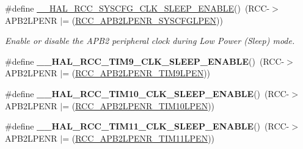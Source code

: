 \begin{DoxyCompactItemize}
\item 
\#define \hyperlink{group___r_c_c___peripheral___clock___sleep___enable___disable_ga6e3a8ca9e554e3aa7aba57d034725655}{\-\_\-\-\_\-\-H\-A\-L\-\_\-\-R\-C\-C\-\_\-\-S\-Y\-S\-C\-F\-G\-\_\-\-C\-L\-K\-\_\-\-S\-L\-E\-E\-P\-\_\-\-E\-N\-A\-B\-L\-E}()~(R\-C\-C-\/$>$A\-P\-B2\-L\-P\-E\-N\-R $\vert$= (\hyperlink{group___peripheral___registers___bits___definition_gaaa82cfc33f0cf71220398bbe1c4b412e}{R\-C\-C\-\_\-\-A\-P\-B2\-L\-P\-E\-N\-R\-\_\-\-S\-Y\-S\-C\-F\-G\-L\-P\-E\-N}))
\begin{DoxyCompactList}\small\item\em Enable or disable the A\-P\-B2 peripheral clock during Low Power (Sleep) mode. \end{DoxyCompactList}\item 
\hypertarget{group___r_c_c___peripheral___clock___sleep___enable___disable_ga8fb59f888889fc998d1f7e64e370c9d1}{\#define {\bfseries \-\_\-\-\_\-\-H\-A\-L\-\_\-\-R\-C\-C\-\_\-\-T\-I\-M9\-\_\-\-C\-L\-K\-\_\-\-S\-L\-E\-E\-P\-\_\-\-E\-N\-A\-B\-L\-E}()~(R\-C\-C-\/$>$A\-P\-B2\-L\-P\-E\-N\-R $\vert$= (\hyperlink{group___peripheral___registers___bits___definition_ga91b882f3dc2b939a53ed3f4caa537de1}{R\-C\-C\-\_\-\-A\-P\-B2\-L\-P\-E\-N\-R\-\_\-\-T\-I\-M9\-L\-P\-E\-N}))}\label{group___r_c_c___peripheral___clock___sleep___enable___disable_ga8fb59f888889fc998d1f7e64e370c9d1}

\item 
\hypertarget{group___r_c_c___peripheral___clock___sleep___enable___disable_gac1215603b81a7d52b7225ec8f628e51d}{\#define {\bfseries \-\_\-\-\_\-\-H\-A\-L\-\_\-\-R\-C\-C\-\_\-\-T\-I\-M10\-\_\-\-C\-L\-K\-\_\-\-S\-L\-E\-E\-P\-\_\-\-E\-N\-A\-B\-L\-E}()~(R\-C\-C-\/$>$A\-P\-B2\-L\-P\-E\-N\-R $\vert$= (\hyperlink{group___peripheral___registers___bits___definition_gae7999e2ebeb1300d0cf6a59ad92c41b6}{R\-C\-C\-\_\-\-A\-P\-B2\-L\-P\-E\-N\-R\-\_\-\-T\-I\-M10\-L\-P\-E\-N}))}\label{group___r_c_c___peripheral___clock___sleep___enable___disable_gac1215603b81a7d52b7225ec8f628e51d}

\item 
\hypertarget{group___r_c_c___peripheral___clock___sleep___enable___disable_ga2d808a429ceb72c79908770e79ff3cfa}{\#define {\bfseries \-\_\-\-\_\-\-H\-A\-L\-\_\-\-R\-C\-C\-\_\-\-T\-I\-M11\-\_\-\-C\-L\-K\-\_\-\-S\-L\-E\-E\-P\-\_\-\-E\-N\-A\-B\-L\-E}()~(R\-C\-C-\/$>$A\-P\-B2\-L\-P\-E\-N\-R $\vert$= (\hyperlink{group___peripheral___registers___bits___definition_gad43fcaa4f4d6fb2b590a6ffee31f8c94}{R\-C\-C\-\_\-\-A\-P\-B2\-L\-P\-E\-N\-R\-\_\-\-T\-I\-M11\-L\-P\-E\-N}))}\label{group___r_c_c___peripheral___clock___sleep___enable___disable_ga2d808a429ceb72c79908770e79ff3cfa}


\end{DoxyCompactItemize}
